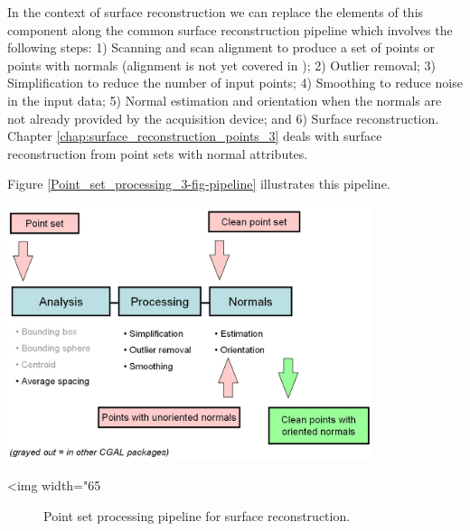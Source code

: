 In the context of surface reconstruction we can replace the elements of this component along the common surface reconstruction pipeline which involves the following steps: 1) Scanning and scan alignment to produce a set of points or points with normals (alignment is not yet covered in \cgal); 2) Outlier removal; 3) Simplification to reduce the number of input points; 4) Smoothing to reduce noise in the input data; 5) Normal estimation and orientation when the normals are not already provided by the acquisition device; and 6) Surface reconstruction. Chapter  \ref{chap:surface_reconstruction_points_3} deals with surface reconstruction from point sets with normal attributes.

Figure \ref{Point_set_processing_3-fig-pipeline} illustrates this pipeline.

\begin{center}
    \label{Point_set_processing_3-fig-pipeline}
    \begin{ccTexOnly}
        \includegraphics[width=0.8\textwidth]{Point_set_processing_3/pipeline} %
    \end{ccTexOnly}
    \begin{ccHtmlOnly}
        <img width="65%
    \end{ccHtmlOnly}
    \begin{figure}[h]
        \caption{Point set processing pipeline for surface reconstruction.}
    \end{figure}
\end{center}


